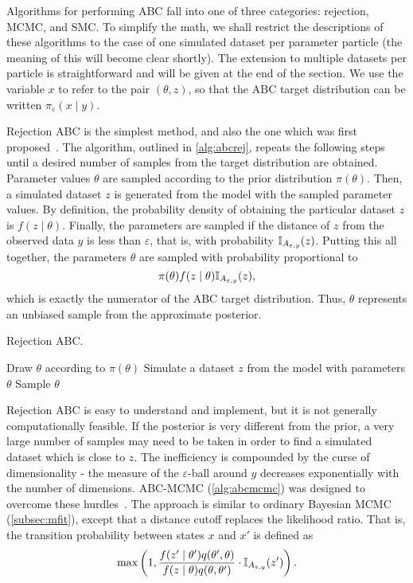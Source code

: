 Algorithms for performing \gls{ABC} fall into one of three categories:
rejection, \gls{MCMC}, and \gls{SMC}. To simplify the math, we shall restrict
the descriptions of these algorithms to the case of one simulated dataset per
parameter particle (the meaning of this will become clear shortly). The
extension to multiple datasets per particle is straightforward and will be
given at the end of the section. We use the variable $x$ to refer to the pair
$(\theta, z)$, so that the \gls{ABC} target distribution can be written
$\pi_\varepsilon(x \mid y)$.

Rejection ABC is the simplest method, and also the one which was first
proposed~\autocite{rubin1984bayesianly, tavare1997inferring}. The algorithm,
outlined in \cref{alg:abcrej}, repeats the following steps until a desired
number of samples from the target distribution are obtained. Parameter values
$\theta$ are sampled according to the prior distribution $\pi(\theta)$. Then, a
simulated dataset $z$ is generated from the model with the sampled parameter
values. By definition, the probability density of obtaining the particular
dataset $z$ is $f(z \mid \theta)$. Finally, the parameters are sampled if the
distance of $z$ from the observed data $y$ is less than $\varepsilon$, that is,
with probability $\mathbb{I}_{A_{\varepsilon, y}}(z)$. Putting this all together, the
parameters $\theta$ are sampled with probability proportional to
\[
  \pi(\theta) f(z \mid \theta) \mathbb{I}_{A_{\varepsilon, y}}(z),
\]
which is exactly the numerator of the \gls{ABC} target distribution. Thus,
$\theta$ represents an unbiased sample from the approximate posterior.

\begin{algorithm}
  \caption{Rejection \gls{ABC}.}
  \begin{algorithmic}
    \Loop
      \State Draw $\theta$ according to $\pi(\theta)$
      \State Simulate a dataset $z$ from the model with parameters $\theta$
        \State Sample $\theta$
      \EndIf
    \EndLoop
  \end{algorithmic}
  \label{alg:abcrej}
\end{algorithm}

Rejection \gls{ABC} is easy to understand and implement, but it is not
generally computationally feasible. If the posterior is very different from the
prior, a very large number of samples may need to be taken in order to find a
simulated dataset which is close to $z$. The inefficiency is compounded
by the curse of dimensionality - the measure of the $\varepsilon$-ball around
$y$ decreases exponentially with the number of dimensions.
\gls{ABC}-\gls{MCMC} (\cref{alg:abcmcmc}) was designed to overcome these
hurdles~\autocite{marjoram2003markov}. The approach is similar to ordinary
Bayesian \gls{MCMC} (\cref{subsec:mfit}), except that a distance cutoff
replaces the likelihood ratio. That is, the transition probability between
states $x$ and $x'$ is defined as
\[
  \max\left(1, \frac{f(z' \mid \theta') q(\theta', \theta)}
                    {f(z \mid \theta) q(\theta, \theta')} 
    \cdot \mathbb{I}_{A_{\varepsilon, y}}(z') \right).
\]

